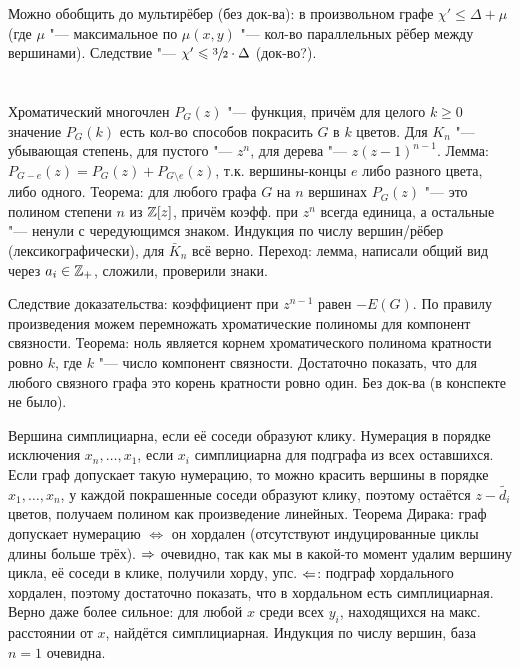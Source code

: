 	Можно обобщить до мультирёбер (без док-ва): в произвольном графе $\chi' \le \Delta + \mu$ (где $\mu$ "--- максимальное по $\mu(x, y)$ "--- кол-во параллельных рёбер между вершинами).
	Следствие "--- $\chi' \leqslant \sfrac 32 \cdot \Delta$ (\TODO док-во?).

\section{} %
	Хроматический многочлен $P_G(z)$ "--- функция, причём для целого $k \ge 0$ значение $P_G(k)$ есть
	кол-во способов покрасить $G$ в $k$ цветов.
	Для $K_n$ "--- убывающая степень, для пустого "--- $z^n$, для дерева "--- $z(z-1)^{n-1}$.
	Лемма: $P_{G-e}(z) = P_G(z) + P_{G \setminus e}(z)$, т.к. вершины-концы $e$ либо разного цвета, либо одного.
	Теорема: для любого графа $G$ на $n$ вершинах $P_G(z)$ "--- это полином степени $n$ из $\mathbb{Z}[z]$,
	причём коэфф. при $z^n$ всегда единица, а остальные "--- ненули с чередующимся знаком.
	Индукция по числу вершин/рёбер (лексикографически), для $\bar K_n$ всё верно.
	Переход: лемма, написали общий вид через $a_i \in \mathbb{Z}_{+}$, сложили, проверили знаки.

	Следствие доказательства: коэффициент при $z^{n-1}$ равен $-E(G)$.
	По правилу произведения можем перемножать хроматические полиномы для компонент связности.
	Теорема: ноль является корнем хроматического полинома кратности ровно $k$, где $k$ "--- число компонент связности.
	Достаточно показать, что для любого связного графа это корень кратности ровно один.
	Без док-ва (\TODO в конспекте не было).

	Вершина симплициарна, если её соседи образуют клику.
	Нумерация в порядке исключения $x_n, \dots, x_1$, если $x_i$ симплициарна для подграфа из всех оставшихся.
	Если граф допускает такую нумерацию, то можно красить вершины в порядке $x_1, \dots, x_n$, у каждой покрашенные
	соседи образуют клику, поэтому остаётся $z - \tilde{d_i}$ цветов, получаем полином как произведение линейных.
	Теорема Дирака: граф допускает нумерацию $\iff$ он хордален (отсутствуют индуцированные циклы длины больше трёх).
	$\Rightarrow$ очевидно, так как мы в какой-то момент удалим вершину цикла, её соседи в клике, получили хорду, упс.
	$\Leftarrow$: подграф хордального хордален, поэтому достаточно показать, что в хордальном есть симплициарная.
	Верно даже более сильное: для любой $x$ среди всех $y_i$, находящихся на макс. расстоянии от $x$, найдётся симплициарная.
	Индукция по числу вершин, база $n=1$ очевидна.

